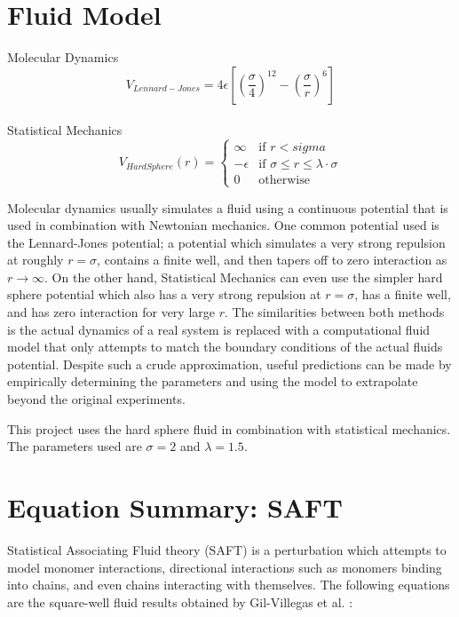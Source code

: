 \section{Fluid Model}
\begin{multicols}{2}
Molecular Dynamics
\begin{equation}
V_{Lennard-Jones}=4\epsilon\left[\left(\frac{\sigma}{4}\right)^{12}-\left(\frac{\sigma}{r}\right)^6\right]
\end{equation}
\\
Statistical Mechanics
\begin{equation}
V_{HardSphere}(r) =  
\begin{cases} 
 \infty &\text{if }r<sigma\\
 -\epsilon &\text{if }\sigma\leq r \leq \lambda\cdot\sigma \\
 0 & \text{otherwise}
\end{cases}
\end{equation}
\end{multicols}
Molecular dynamics usually simulates a fluid using a continuous potential that is used in combination with Newtonian mechanics. One common potential used is the Lennard-Jones potential; a potential which simulates a very strong repulsion at roughly $r=\sigma$, contains a finite well, and then tapers off to zero interaction as $r\rightarrow\infty$. On the other hand, Statistical Mechanics can even use the simpler hard sphere potential which also has a very strong repulsion at $r=\sigma$, has a finite well, and has zero interaction for very large $r$. The similarities between both methods is the actual dynamics of a real system is replaced with a computational fluid model that only attempts to match the boundary conditions of the actual fluids potential. Despite such a crude approximation, useful predictions can be made by empirically determining the parameters and using the model to extrapolate beyond the original experiments.

This project uses the hard sphere fluid in combination with statistical mechanics. The parameters used are $\sigma=2$ and $\lambda=1.5$.
\pagebreak
\section{Equation Summary: SAFT  }
Statistical Associating Fluid theory (SAFT) is a perturbation which attempts to model monomer interactions, directional interactions such as monomers binding into chains, and even chains interacting with themselves\cite{gil1997statistical}. The following equations are the square-well fluid results obtained by Gil-Villegas et al. \cite{gil1997statistical}:

